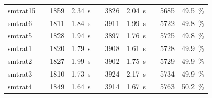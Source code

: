 \begin{table}[]
\begin{tabularx}{\textwidth}{lXrrXrrXrr}
    	\rowcolor{blue!20}
    	smtrat15
    	&& 1859 & 2.34~s
    	&& 3826 & 2.04~s
    	&& 5685 & 49.5~\%
    	\\
    	\rowcolor{green!20}
    	smtrat6
    	&& 1811 & 1.84~s
    	&& 3911 & 1.99~s
    	&& 5722 & 49.8~\%
    	\\
    	\rowcolor{green!20}
    	smtrat5
    	&& 1828 & 1.94~s
    	&& 3897 & 1.76~s
    	&& 5725 & 49.8~\%
    	\\
    	\rowcolor{green!20}
    	smtrat1
    	&& 1820 & 1.79~s
    	&& 3908 & 1.61~s
    	&& 5728 & 49.9~\%
    	\\
     	\rowcolor{green!20}
    	smtrat2
    	&& 1827 & 1.99~s
    	&& 3902 & 1.75~s
    	&& 5729 & 49.9~\%
    	\\
    	\rowcolor{green!20}
    	smtrat3
    	&& 1810 & 1.73~s
    	&& 3924 & 2.17~s
    	&& 5734 & 49.9~\%
    	\\
     	\rowcolor{green!20}
    	smtrat4
    	&& 1849 & 1.64~s
    	&& 3914 & 1.67~s
    	&& 5763 & 50.2~\%
    	\\
    	\bottomrule
    \end{tabularx}
    \label{table:results_our_solvers}
\end{table}
